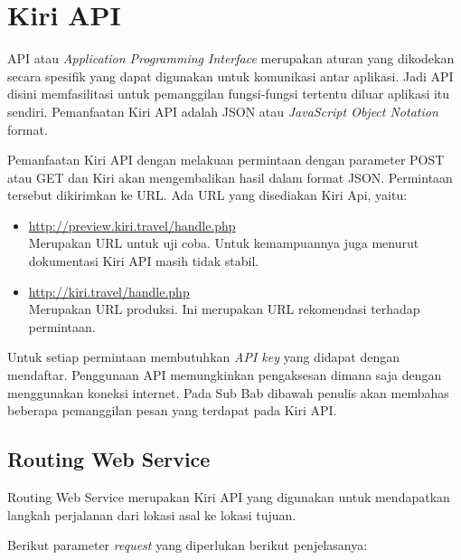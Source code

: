 \section{Kiri API}
\label{sec:Kiri API}
\hspace{0.5cm} API atau \textit{Application Programming Interface} merupakan aturan yang dikodekan secara spesifik yang dapat digunakan untuk komunikasi antar aplikasi. Jadi API disini memfasilitasi untuk pemanggilan fungsi-fungsi tertentu diluar aplikasi itu sendiri. Pemanfaatan Kiri API adalah JSON atau \textit{JavaScript Object Notation} format. 

\hspace{0.5cm} Pemanfaatan Kiri API dengan melakuan permintaan dengan parameter POST atau GET dan Kiri akan mengembalikan hasil dalam format JSON. Permintaan tersebut dikirimkan ke URL. Ada URL yang disediakan Kiri Api, yaitu:
\begin{itemize}
	\item \url{http://preview.kiri.travel/handle.php} \\
	Merupakan URL untuk uji coba. Untuk kemampuannya juga menurut dokumentasi Kiri API masih tidak stabil.
	\item \url{http://kiri.travel/handle.php} \\
	Merupakan URL produksi. Ini merupakan URL rekomendasi terhadap permintaan.
\end{itemize}
Untuk setiap permintaan membutuhkan \textit{API key} yang didapat dengan mendaftar\cite{Kiri}. Penggunaan API memungkinkan pengaksesan dimana saja dengan menggunakan koneksi internet. Pada Sub Bab dibawah penulis akan membahas beberapa pemanggilan pesan yang terdapat pada Kiri API.

\subsection{Routing Web Service}
\label{subsec:Routing Web Service}
\hspace{0.5cm} Routing Web Service merupakan Kiri API yang digunakan untuk mendapatkan langkah perjalanan dari lokasi asal ke lokasi tujuan.

Berikut parameter \textit{request} yang diperlukan berikut penjelasanya:

